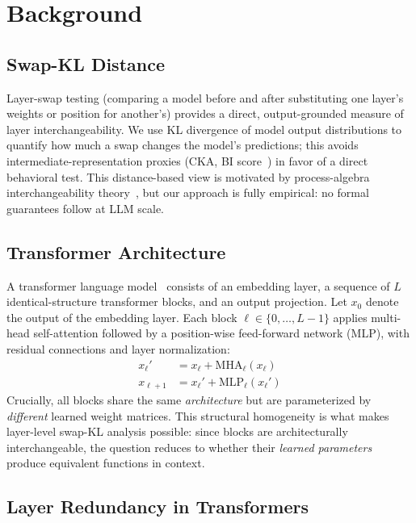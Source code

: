 \documentclass{article}
\begin{document}
\section{Background}
\label{sec:background}

\subsection{Swap-KL Distance}
\label{sec:bg_swap}

Layer-swap testing (comparing a model before and after substituting one layer's weights or position for another's) provides a direct, output-grounded measure of layer interchangeability.
We use KL divergence of model output distributions to quantify how much a swap changes the model's predictions; this avoids intermediate-representation proxies (CKA, BI score~\citep{men2024shortgpt}) in favor of a direct behavioral test.
This distance-based view is motivated by process-algebra interchangeability theory~\citep{park1981concurrency,milner1989communication}, but our approach is fully empirical: no formal guarantees follow at LLM scale.

\subsection{Transformer Architecture}
\label{sec:bg_transformer}

A transformer language model~\citep{vaswani2017attention} consists of an embedding layer, a sequence of $L$ identical-structure transformer blocks, and an output projection. Let $x_0$ denote the output of the embedding layer. Each block $\ell \in \{0, \ldots, L{-}1\}$ applies multi-head self-attention followed by a position-wise feed-forward network (MLP), with residual connections and layer normalization:
\begin{align}
    x_\ell' &= x_\ell + \text{MHA}_\ell(x_\ell) \\
    x_{\ell+1} &= x_\ell' + \text{MLP}_\ell(x_\ell')
\end{align}
Crucially, all blocks share the same \emph{architecture} but are parameterized by \emph{different} learned weight matrices. This structural homogeneity is what makes layer-level swap-KL analysis possible: since blocks are architecturally interchangeable, the question reduces to whether their \emph{learned parameters} produce equivalent functions in context.

\subsection{Layer Redundancy in Transformers}
\label{sec:bg_redundancy}
\end{document}
